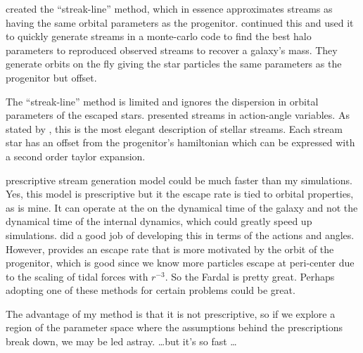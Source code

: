         \citet{2012MNRAS.420.2700K} created the ``streak-line'' method, which in essence approximates streams as having the same orbital parameters as the progenitor. \citet{2014ApJ...795...94B} continued this and used it to quickly generate streams in a monte-carlo code to find the best halo parameters to reproduced observed streams to recover a galaxy's mass. They generate orbits on the fly giving the star particles the same parameters as the progenitor but offset. 

        The ``streak-line'' method is limited and ignores the dispersion in orbital parameters of the escaped stars. \citet{2011MNRAS.413.1852E} presented streams in action-angle variables. As stated by \citet{2015MNRAS.452..301F}, this is the most elegant description of stellar streams. Each stream star has an offset from the progenitor's hamiltonian which can be expressed with a second order taylor expansion. 

        \citet{2015MNRAS.452..301F} prescriptive stream generation model could be much faster than my simulations. Yes, this model is prescriptive but it the escape rate is tied to orbital properties, as is mine. It can operate at the on the dynamical time of the galaxy and not the dynamical time of the internal dynamics, which could greatly speed up simulations. \citet{2014ApJ...795...95B} did a good job of developing this in terms of the actions and angles. However, \citet{2015MNRAS.452..301F} provides an escape rate that is more motivated by the orbit of the progenitor, which is good since we know more particles escape at peri-center due to the scaling of tidal forces with $r^{-3}$. So the Fardal is pretty great. Perhaps adopting one of these methods for certain problems could be great. 

        The advantage of my method is that it is not prescriptive, so if we explore a region of the parameter space where the assumptions behind the prescriptions break down, we may be led astray. \dots but it's so fast \dots 

